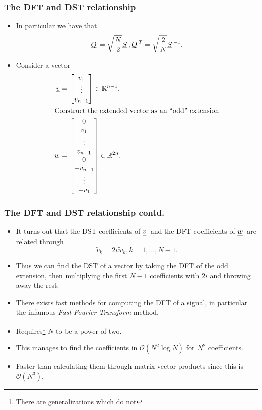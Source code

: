 \documentclass{beamer}
\newcommand{\ub}[1]{\underbar{$#1$}\,}
\begin{document}
\begin{frame}\frametitle{The DFT and DST relationship}
  \begin{itemize}
    \item In particular we have that
      \[
        \ub{Q} = \sqrt{\frac{N}{2}}\ub{S}, \ub{Q}^T = \sqrt{\frac{2}{N}}\ub{S}^{-1}.
      \]
    \item Consider a vector
      \begin{align*}
        \underline{v} &= 
        \begin{bmatrix}
          v_1 \\
          \vdots \\
          v_{n-1}
        \end{bmatrix}
        \in \mathbb{R}^{n-1}. \\
        \intertext{Construct the extended vector as an ``odd'' extension}
        w &=
        \begin{bmatrix}
          0 \\ 
          v_1 \\
          \vdots \\
          v_{n-1} \\
          0 \\
          -v_{n-1} \\
          \vdots \\
          -v_1
        \end{bmatrix}
        \in \mathbb{R}^{2n}.
      \end{align*}
  \end{itemize}
\end{frame}
\begin{frame}\frametitle{The DFT and DST relationship contd.}
  \begin{itemize}
    \item It turns out that the DST coefficients of $\ub{v}$ and the DFT coefficients
      of $\ub{w}$ are related through
      \[
        \tilde{v}_k = 2i\tilde{w}_k, k = 1,\ldots,N-1.
      \]
    \item Thus we can find the DST of a vector by taking the DFT of the odd extension,
      then multiplying the first $N-1$ coefficients with $2i$ and throwing away the rest.
    \item There exists fast methods for computing the DFT of a signal, in particular the
      infamous \emph{Fast Fourier Transform} method.
    \item Requires\footnote{There are generalizations which do not} $N$ to be a power-of-two.
    \item This manages to find the coefficients in $\mathcal{O}\left(N^2\log N\right)$ for $N^2$ coefficients.
    \item Faster than calculating them through matrix-vector products since this is $\mathcal{O}\left(N^3\right)$.
  \end{itemize}
\end{frame}
\end{document}
